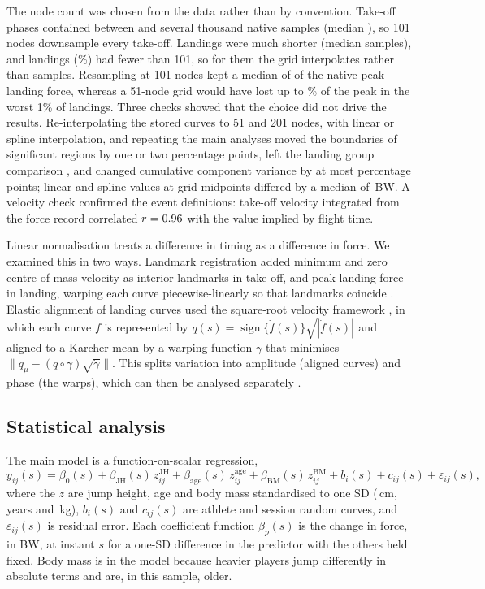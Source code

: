 The node count was chosen from the data rather than by convention. Take-off phases contained between \toSampMin{} and several thousand native samples (median \toSampMedian), so 101 nodes downsample every take-off. Landings were much shorter (median \ldSampMedian{} samples), and \nLdUnder{} landings (\pctLdUnder\%) had fewer than 101, so for them the grid interpolates rather than samples. Resampling at 101 nodes kept a median of \retLdMedian{} of the native peak landing force, whereas a 51-node grid would have lost up to \decLossLdP\% of the peak in the worst 1\% of landings. Three checks showed that the choice did not drive the results. Re-interpolating the stored curves to 51 and 201 nodes, with linear or spline interpolation, and repeating the main analyses moved the boundaries of significant regions by one or two percentage points, left the landing group comparison \nodeSpmLdSame, and changed cumulative component variance by at most \nodePcMaxDiff{} percentage points; linear and spline values at grid midpoints differed by a median of \splineDiffMedian{}\,BW. A velocity check confirmed the event definitions: take-off velocity integrated from the force record correlated $r = 0.96$ with the value implied by flight time.

Linear normalisation treats a difference in timing as a difference in force. We examined this in two ways. Landmark registration added minimum and zero centre-of-mass velocity as interior landmarks in take-off, and peak landing force in landing, warping each curve piecewise-linearly so that landmarks coincide \parencite{moudy2018,white2022}. Elastic alignment of landing curves used the square-root velocity framework \parencite{srivastava2011,tucker2013}, in which each curve $f$ is represented by $q(s) = \operatorname{sign}\{\dot f(s)\}\sqrt{|\dot f(s)|}$ and aligned to a Karcher mean by a warping function $\gamma$ that minimises $\lVert q_{\mu} - (q \circ \gamma)\sqrt{\dot\gamma} \rVert$. This splits variation into amplitude (aligned curves) and phase (the warps), which can then be analysed separately \parencite{pataky2022}.

\subsection{Statistical analysis}

The main model is a function-on-scalar regression,
\begin{equation}
y_{ij}(s) = \beta_0(s) + \beta_{\mathrm{JH}}(s)\,z^{\mathrm{JH}}_{ij} + \beta_{\mathrm{age}}(s)\,z^{\mathrm{age}}_{ij} + \beta_{\mathrm{BM}}(s)\,z^{\mathrm{BM}}_{ij} + b_i(s) + c_{ij}(s) + \varepsilon_{ij}(s),
\label{eq:fosr}
\end{equation}
where the $z$ are jump height, age and body mass standardised to one SD (\sdJH\,cm, \sdAge{} years and \sdBM\,kg), $b_i(s)$ and $c_{ij}(s)$ are athlete and session random curves, and $\varepsilon_{ij}(s)$ is residual error. Each coefficient function $\beta_p(s)$ is the change in force, in BW, at instant $s$ for a one-SD difference in the predictor with the others held fixed. Body mass is in the model because heavier players jump differently in absolute terms and are, in this sample, older.

